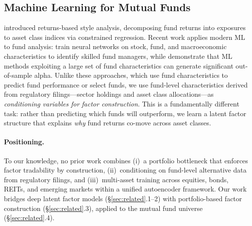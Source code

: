 \subsection{Machine Learning for Mutual Funds}

\citet{Sharpe1992style} introduced returns-based style analysis, decomposing fund returns into exposures to asset class indices via constrained regression. Recent work applies modern ML to fund analysis: \citet{Kaniel2023skill} train neural networks on stock, fund, and macroeconomic characteristics to identify skilled fund managers, while \citet{DeMiguel2023fund} demonstrate that ML methods exploiting a large set of fund characteristics can generate significant out-of-sample alpha. Unlike these approaches, which use fund characteristics to predict fund performance or select funds, we use fund-level characteristics derived from regulatory filings---sector holdings and asset class allocations---as \emph{conditioning variables for factor construction}. This is a fundamentally different task: rather than predicting which funds will outperform, we learn a latent factor structure that explains \emph{why} fund returns co-move across asset classes.

\paragraph{Positioning.} To our knowledge, no prior work combines (i)~a portfolio bottleneck that enforces factor tradability by construction, (ii)~conditioning on fund-level alternative data from regulatory filings, and (iii)~multi-asset training across equities, bonds, REITs, and emerging markets within a unified autoencoder framework. Our work bridges deep latent factor models (\S\ref{sec:related}.1--2) with portfolio-based factor construction (\S\ref{sec:related}.3), applied to the mutual fund universe (\S\ref{sec:related}.4).
